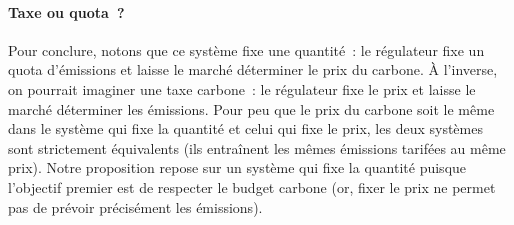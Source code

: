 \documentclass[a5paper,french,openany]{memoir}
\begin{document}

\paragraph{Taxe ou quota~?}
Pour conclure, notons que ce système fixe une quantité~: le régulateur fixe un quota d'émissions et laisse le marché déterminer le prix du carbone. À l'inverse, on pourrait imaginer une taxe carbone~: le régulateur fixe le prix et laisse le marché déterminer les émissions. Pour peu que le prix du carbone soit le même dans le système qui fixe la quantité et celui qui fixe le prix, les deux systèmes sont strictement équivalents (ils entraînent les mêmes émissions tarifées au même prix). Notre proposition repose sur un système qui fixe la quantité puisque l'objectif premier est de respecter le budget carbone (or, fixer le prix ne permet pas de prévoir précisément les émissions). 
\end{document}
